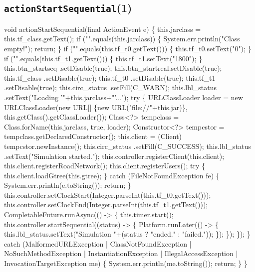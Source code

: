 \subsection{\texttt{actionStartSequential}(1)}
\nwenddocs{}\endmoddef{}
void actionStartSequential(final ActionEvent e) \{
  this.jarclass = this.tf_class.getText();
  if ("".equals(this.jarclass)) \{
    System.err.println("Class empty!");
    return;
  \}
  if ("".equals(this.tf_t0.getText())) \{
    this.tf_t0.setText("0");
  \}
  if ("".equals(this.tf_t1.getText())) \{
    this.tf_t1.setText("1800");
  \}
  this.btn_startseq .setDisable(true);
  this.btn_startreal.setDisable(true);
  this.tf_class     .setDisable(true);
  this.tf_t0        .setDisable(true);
  this.tf_t1        .setDisable(true);
  this.circ_status  .setFill(C_WARN);
  this.lbl_status   .setText("Loading '"+this.jarclass+"'...");
  try \{
    URLClassLoader loader = new URLClassLoader(new URL[] \{new URL("file://"+this.jar)\},
        this.getClass().getClassLoader());
    Class<?> tempclass = Class.forName(this.jarclass, true, loader);
    Constructor<?> tempcstor = tempclass.getDeclaredConstructor();
    this.client = (Client) tempcstor.newInstance();
    this.circ_status  .setFill(C_SUCCESS);
    this.lbl_status   .setText("Simulation started.");
    this.controller.registerClient(this.client);
    this.client.registerRoadNetwork();
    this.client.registerUsers();
    try \{
      this.client.loadGtree(this.gtree);
    \} catch (FileNotFoundException fe) \{
      System.err.println(e.toString());
      return;
    \}
    this.controller.setClockStart(Integer.parseInt(this.tf_t0.getText()));
    this.controller.setClockEnd(Integer.parseInt(this.tf_t1.getText()));
    CompletableFuture.runAsync(() -> \{
      this.timer.start();
      this.controller.startSequential((status) -> \{
        Platform.runLater(() -> \{
          this.lbl_status.setText("Simulation "+(status ? "ended." : "failed."));
        \});
      \});
    \});
  \} catch (MalformedURLException
      | ClassNotFoundException
      | NoSuchMethodException
      | InstantiationException
      | IllegalAccessException
      | InvocationTargetException me) \{
    System.err.println(me.toString());
    return;
  \}
\}
\eatline
